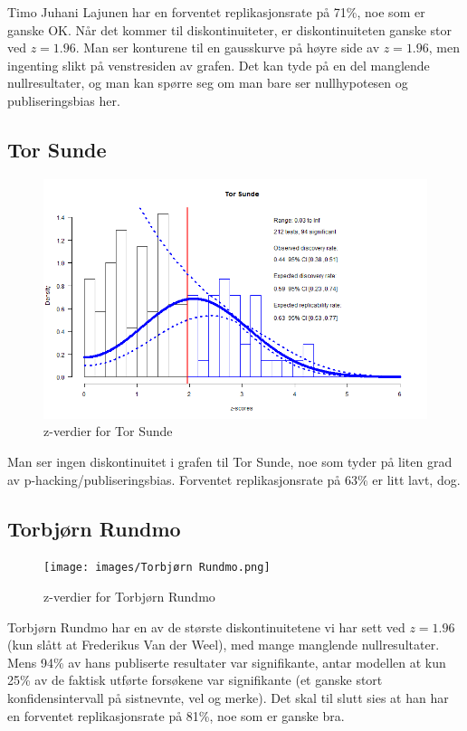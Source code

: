 \documentclass[doc,norsk]{apa7}
\begin{document}
Timo Juhani Lajunen har en forventet replikasjonsrate på 71\%, noe som er ganske OK. Når det kommer til diskontinuiteter, er diskontinuiteten ganske stor ved $z=1.96$. Man ser konturene til en gausskurve på høyre side av $z=1.96$, men ingenting slikt på venstresiden av grafen. Det kan tyde på en del manglende nullresultater, og man kan spørre seg om man bare ser nullhypotesen og publiseringsbias her.

\subsection{Tor Sunde}
\begin{figure}[h!]
    \centering
    \includegraphics[width=\textwidth]{images/Tor Sunde.png}
    \caption{z-verdier for Tor Sunde}
\end{figure}

Man ser ingen diskontinuitet i grafen til Tor Sunde, noe som tyder på liten grad av p-hacking/publiseringsbias. Forventet replikasjonsrate på $63\%$ er litt lavt, dog.

\subsection{Torbjørn Rundmo}
\begin{figure}[h!]
    \centering
    \texttt{[image: images/Torbjørn Rundmo.png]}
    \caption{z-verdier for Torbjørn Rundmo}
\end{figure}

Torbjørn Rundmo har en av de største diskontinuitetene vi har sett ved $z=1.96$ (kun slått at Frederikus Van der Weel), med mange manglende nullresultater. Mens 94\% av hans publiserte resultater var signifikante, antar modellen at kun 25\% av de faktisk utførte forsøkene var signifikante (et ganske stort konfidensintervall på sistnevnte, vel og merke). Det skal til slutt sies at han har en forventet replikasjonsrate på 81\%, noe som er ganske bra.
\end{document}
